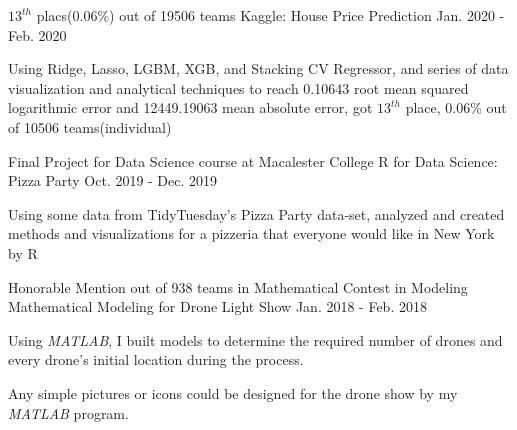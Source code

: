 

\begin{cventries}
  \cventry
    {$13^{th}$ placs(0.06\%) out of 19506 teams} %
    {Kaggle: House Price Prediction} %
    {} %
    {Jan. 2020 - Feb. 2020} %
    {
      \begin{cvitems} %
        \item {Using Ridge, Lasso, LGBM, XGB, and Stacking CV Regressor, and series of data visualization and analytical techniques to reach 0.10643 root mean squared logarithmic error and 12449.19063 mean absolute error, got $13^{th}$ place, 0.06\% out of 10506 teams(individual)}
      \end{cvitems}
    }

  
  \cventry
    {Final Project for Data Science course at Macalester College} %
    {R for Data Science: Pizza Party} %
    {} %
    {Oct. 2019 - Dec. 2019} %
    {
      \begin{cvitems} %
        \item {Using some data from TidyTuesday’s Pizza Party data-set, analyzed and created methods and visualizations for a pizzeria that everyone would like in New York by R}
      \end{cvitems}
    }

  \cventry
    {Honorable Mention out of 938 teams in Mathematical Contest in Modeling} %
    {Mathematical Modeling for Drone Light Show} %
    {} %
    {Jan. 2018 - Feb. 2018} %
    {
      \begin{cvitems} %
        \item {Using \textit{MATLAB}, I built models to determine the required number of drones and every drone’s initial location during the process.}
        \item {Any simple pictures or icons could be designed for the drone show by my \textit{MATLAB} program.}
      \end{cvitems}
    }


\end{cventries}
